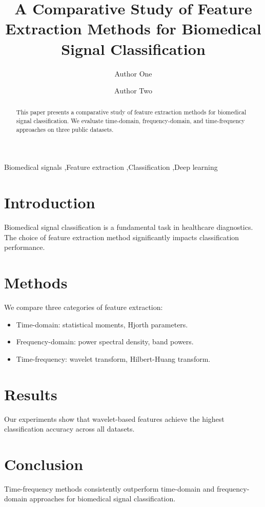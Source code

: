 \documentclass[review,3p,times]{elsarticle}
\begin{document}
\begin{frontmatter}
\title{A Comparative Study of Feature Extraction Methods
       for Biomedical Signal Classification}

\author[a]{Author One}
\author[b]{Author Two}


\begin{abstract}
This paper presents a comparative study of feature extraction
methods for biomedical signal classification. We evaluate
time-domain, frequency-domain, and time-frequency approaches
on three public datasets.
\end{abstract}

\begin{keyword}
Biomedical signals \sep Feature extraction \sep Classification \sep Deep learning
\end{keyword}
\end{frontmatter}

\section{Introduction}
Biomedical signal classification is a fundamental task in
healthcare diagnostics. The choice of feature extraction
method significantly impacts classification performance.

\section{Methods}
We compare three categories of feature extraction:
\begin{itemize}
\item Time-domain: statistical moments, Hjorth parameters.
\item Frequency-domain: power spectral density, band powers.
\item Time-frequency: wavelet transform, Hilbert-Huang transform.
\end{itemize}

\section{Results}
Our experiments show that wavelet-based features achieve
the highest classification accuracy across all datasets.

\section{Conclusion}
Time-frequency methods consistently outperform time-domain
and frequency-domain approaches for biomedical signal classification.



\end{document}
